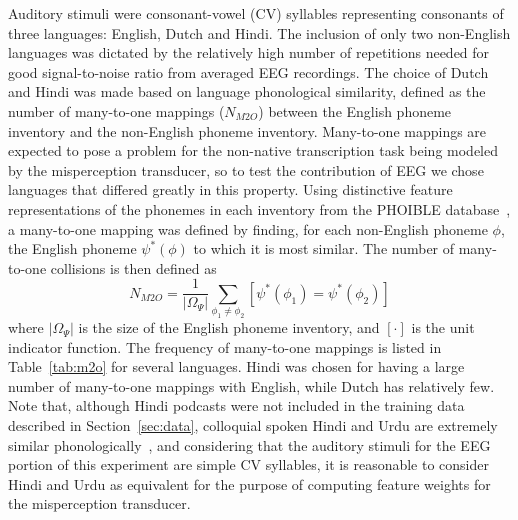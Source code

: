 Auditory stimuli were consonant-vowel
(CV) syllables representing consonants of three languages: English,
Dutch and Hindi. The inclusion of only two non-English languages 
was dictated by the relatively high number of
repetitions needed for good signal-to-noise ratio from averaged
EEG recordings. The choice of Dutch and Hindi was made based on language
phonological similarity, defined as the number of many-to-one mappings
($N_{M2O}$) between the English phoneme inventory
and the non-English phoneme inventory.
Many-to-one mappings are expected to pose a problem for the 
non-native transcription task being modeled by the misperception 
transducer, so to test the contribution of EEG we chose languages that 
differed greatly in this property. 
Using distinctive feature representations of the phonemes in each
inventory from the PHOIBLE database~\cite{phoible}, a many-to-one 
mapping was defined by finding, for each
non-English phoneme $\phi$, the English phoneme $\psi^*(\phi)$ to which
it is most similar.
The number of many-to-one collisions is then defined as
\begin{equation}
  N_{M2O}=\frac{1}{|\Omega_\Psi|}\sum_{\phi_1\ne\phi_2}
  \left[\psi^*(\phi_1)=\psi^*(\phi_2)\right]
\label{eq:m2o}
\end{equation}
where $|\Omega_\Psi|$ is the size of the English phoneme inventory,
and $\left[\cdot\right]$ is the unit indicator function.
The frequency of many-to-one mappings is listed in
Table~\ref{tab:m2o} for several languages.
Hindi was chosen for having a large number of
many-to-one mappings with English, while Dutch has relatively few. 
Note that, although Hindi podcasts were not included in the training
data described in Section~\ref{sec:data}, colloquial spoken Hindi and
Urdu are extremely similar phonologically~\cite{Kachru90}, and
considering that the auditory stimuli for the EEG portion of this
experiment are simple CV syllables, it is reasonable to consider Hindi
and Urdu as equivalent for the purpose of computing feature weights for
the misperception transducer.

